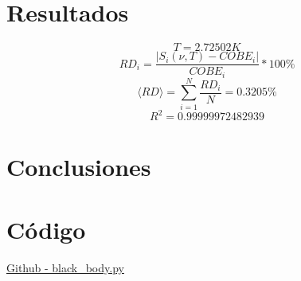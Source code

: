 \documentclass[12pt,letterpaper]{article}
\begin{document}
\begin{multicols}{2}
\section*{Resultados}
\begin{equation*}
    T=2.72502K
\end{equation*}
\begin{equation*}
    RD_i = \frac{|S_i(\nu,T)-COBE_i|}{COBE_i}*100\%
\end{equation*}
\begin{equation*}
    \langle RD \rangle = \sum\limits_{i=1}^N \frac{RD_i}{N} = 0.3205\%
\end{equation*}
\begin{equation*}
    R^2=0.99999972482939
    \label{coef_deter}
\end{equation*}
\section*{Conclusiones}


\nocite{*}
\section*{Código}
\href{https://github.com/giovannilopez9808/Notas_Agosto_2020/blob/master/AMC/Reto1/fit.py}{Github - black_body.py}
\end{multicols}
\end{document}
